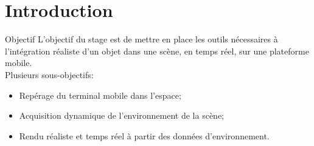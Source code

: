 \documentclass{beamer}
\begin{document}
\frame{\titlepage}


\section{Introduction}
\begin{frame}{Objectif}
	L'objectif du stage est de mettre en place les outils nécessaires à l'intégration réaliste d'un objet dans une scène, en temps réel, sur une plateforme mobile.\\[.5cm]
	Plusieurs sous-objectifs:
	\begin{itemize}
		\item Repérage du terminal mobile dans l'espace;
		\item Acquisition dynamique de l'environnement de la scène;
		\item Rendu réaliste et temps réel à partir des données d'environnement.
	\end{itemize}
\end{frame}
\end{document}
